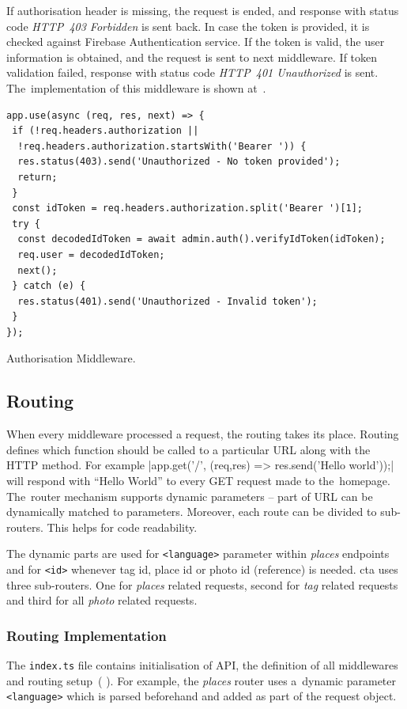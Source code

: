 If authorisation header is missing, the request is ended, and response with status code \textit{HTTP~403 Forbidden} is sent back. In case the token is provided, it is checked against Firebase Authentication service. If the token is valid, the user information is obtained, and the request is sent to next middleware. If token validation failed, response with status code \textit{HTTP~401 Unauthorized} is sent. The~implementation of this middleware is shown at~.

\begin{listing}[ht]
\begin{verbatim}
app.use(async (req, res, next) => {
 if (!req.headers.authorization || 
  !req.headers.authorization.startsWith('Bearer ')) {
  res.status(403).send('Unauthorized - No token provided');
  return;
 }
 const idToken = req.headers.authorization.split('Bearer ')[1];
 try {
  const decodedIdToken = await admin.auth().verifyIdToken(idToken);
  req.user = decodedIdToken;
  next();
 } catch (e) {
  res.status(401).send('Unauthorized - Invalid token');
 }
});
\end{verbatim}
\caption{Authorisation Middleware.}
\label{listing:cta-auth-middleware}
\end{listing}

\subsection{Routing}
When every middleware processed a request, the routing takes its place. Routing defines which function should be called to a particular URL along with the HTTP method. For example |app.get('/', (req,res) => res.send('Hello world'));| will respond with ``Hello World'' to every GET request made to the~homepage. The~router mechanism supports dynamic parameters -- part of URL can be dynamically matched to parameters. Moreover, each route can be divided to sub-routers. This helps for code readability. 

The dynamic parts are used for \verb|<language>| parameter within \textit{places} endpoints and for \verb|<id>| whenever tag id, place id or photo id (reference) is needed. \gls{cta} uses three sub-routers. One for \textit{places} related requests, second for \textit{tag} related requests and third for all \textit{photo} related requests.

\subsubsection{Routing Implementation}
The \verb|index.ts| file contains initialisation of API, the definition of all middlewares and routing setup~(
). For example, the \textit{places} router uses a~dynamic parameter \verb|<language>| which is parsed beforehand and added as part of the request object.

